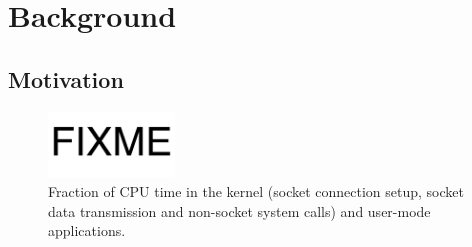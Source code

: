 \section{Background}
\label{sec:background}

\subsection{Motivation}
\label{subsec:motivation}

\begin{figure}[t]
	\centering
	\includegraphics[width=0.3\textwidth]{images/fixme}
	\caption{Fraction of CPU time in the kernel (socket connection setup, socket data transmission and non-socket system calls) and user-mode applications.}
	\label{fig:socket-kernel-time}
\end{figure}





